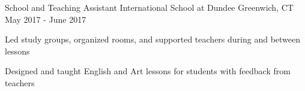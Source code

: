 \begin{cventries}
  \cventry
  {School and Teaching Assistant}
  {International School at Dundee}
  {Greenwich, CT}
  {May 2017 - June 2017}
  {
    \begin{cvitems}
      \item{Led study groups, organized rooms, and supported teachers during and between lessons}
      \item{Designed and taught English and Art lessons for students with feedback from teachers}
    \end{cvitems}
  }
\end{cventries}
